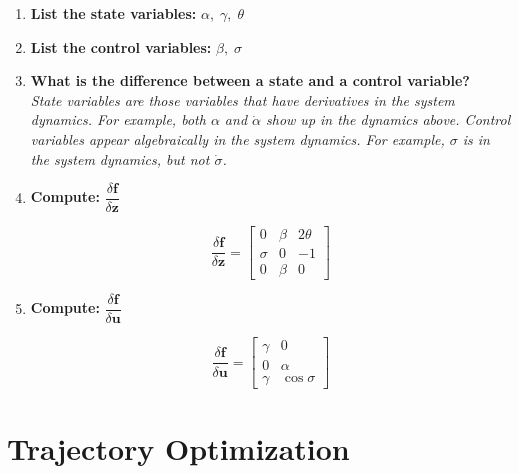 \vspace{0.5em}
\begin{enumerate}
  \item \textbf{List the state variables: } $\alpha, \; \gamma, \; \theta$
  \vspace{0.6em}
  \item \textbf{List the control variables: } $\beta, \; \sigma$
  \vspace{0.6em}
  \item \textbf{What is the difference between a state and a control variable? } \\
  \textit{State variables are those variables that have derivatives in the system dynamics.
          For example, both $\alpha$ and $\dot{\alpha}$ show up in the dynamics above.
          Control variables appear algebraically in the system dynamics.
          For example, $\sigma$ is in the system dynamics, but not $\dot{\sigma}$. }
  \item \textbf{Compute: } $\dfrac{\delta \bm{f}}{\delta \bm{z}}$

  \begin{equation*}
  \dfrac{\delta \bm{f}}{\delta \bm{z}} =
  \begin{bmatrix}
    0      & \beta & 2\theta \\
    \sigma & 0     & -1      \\
    0      & \beta & 0
  \end{bmatrix}
  \end{equation*}

  \item \textbf{Compute: } $\dfrac{\delta \bm{f}}{\delta \bm{u}}$

  \begin{equation*}
  \dfrac{\delta \bm{f}}{\delta \bm{u}} =
  \begin{bmatrix}
    \gamma & 0 \\
    0      & \alpha  \\
    \gamma & \cos{\sigma}
  \end{bmatrix}
  \end{equation*}


\end{enumerate}


\pagebreak
\section{Trajectory Optimization}

